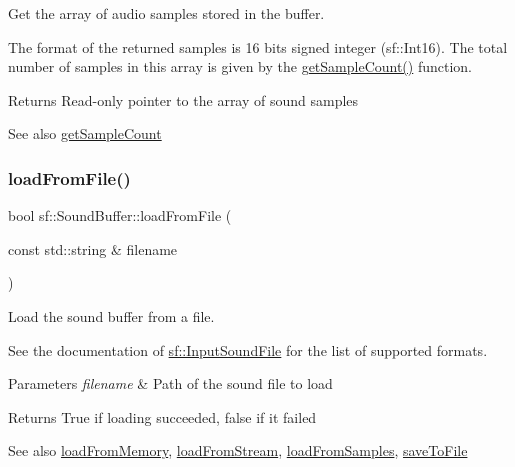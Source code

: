Get the array of audio samples stored in the buffer. 

The format of the returned samples is 16 bits signed integer (sf\+::\+Int16). The total number of samples in this array is given by the \hyperlink{classsf_1_1_sound_buffer_aebe2a4bdbfbd9249353748da3f6a4fa1}{get\+Sample\+Count()} function.

\begin{DoxyReturn}{Returns}
Read-\/only pointer to the array of sound samples
\end{DoxyReturn}
\begin{DoxySeeAlso}{See also}
\hyperlink{classsf_1_1_sound_buffer_aebe2a4bdbfbd9249353748da3f6a4fa1}{get\+Sample\+Count} 
\end{DoxySeeAlso}
\mbox{\label{classsf_1_1_sound_buffer_a2be6a8025c97eb622a7dff6cf2594394}} 
\subsubsection{\texorpdfstring{load\+From\+File()}{loadFromFile()}}
{\footnotesize\ttfamily bool sf\+::\+Sound\+Buffer\+::load\+From\+File (\begin{DoxyParamCaption}\item[{const std\+::string \&}]{filename }\end{DoxyParamCaption})}



Load the sound buffer from a file. 

See the documentation of \hyperlink{classsf_1_1_input_sound_file}{sf\+::\+Input\+Sound\+File} for the list of supported formats.


\begin{DoxyParams}{Parameters}
{\em filename} & Path of the sound file to load\\
\hline
\end{DoxyParams}
\begin{DoxyReturn}{Returns}
True if loading succeeded, false if it failed
\end{DoxyReturn}
\begin{DoxySeeAlso}{See also}
\hyperlink{classsf_1_1_sound_buffer_af8cfa5599739a7edae69c5cba273d33f}{load\+From\+Memory}, \hyperlink{classsf_1_1_sound_buffer_ad292156b1e01f6dabd4c0c277d5e079e}{load\+From\+Stream}, \hyperlink{classsf_1_1_sound_buffer_a42d51ce4bb3b60c7ea06f63c273fd063}{load\+From\+Samples}, \hyperlink{classsf_1_1_sound_buffer_aade64260c6375580a085314a30be007e}{save\+To\+File} 
\end{DoxySeeAlso}
\mbox{\label{classsf_1_1_sound_buffer_af8cfa5599739a7edae69c5cba273d33f}} 
